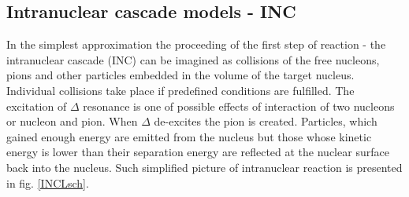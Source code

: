 
\subsection{Intranuclear cascade models - INC}

In the simplest approximation the proceeding of the first step of reaction - the intranuclear cascade (INC) 
can be imagined as collisions of the free nucleons, pions and other particles embedded in the volume of the target nucleus. 
Individual collisions take place if predefined conditions are fulfilled. The excitation of $\Delta$ resonance is one 
of possible effects of interaction of two nucleons or nucleon and pion. When $\Delta$ de-excites the pion is created. 
Particles, which gained enough energy are emitted from the nucleus but those whose kinetic energy is lower than 
their separation energy are reflected at the nuclear surface back into the nucleus. Such simplified picture of intranuclear 
reaction is presented in fig. \ref{INCLsch}.

